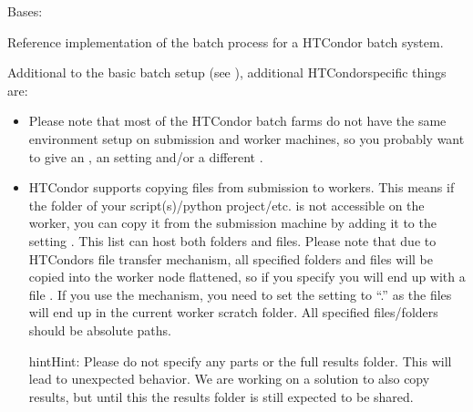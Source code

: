 \documentclass[letterpaper,10pt,english]{sphinxmanual}
\begin{document}
\begin{fulllineitems}
\label{\detokenize{usage/batch:b2luigi.batch.processes.htcondor.HTCondorProcess}}
Bases: {\hyperref[\detokenize{usage/batch:b2luigi.batch.processes.BatchProcess}]{}}

Reference implementation of the batch process for a HTCondor batch system.

Additional to the basic batch setup (see {\hyperref[\detokenize{usage/batch:batch-label}]{}}), additional
HTCondor\sphinxhyphen{}specific things are:
\begin{itemize}
\item {} 
Please note that most of the HTCondor batch farms do not have the same
environment setup on submission and worker machines, so you probably want to give an
, an  setting and/or a different .

\item {} 
HTCondor supports copying files from submission to workers. This means if the
folder of your script(s)/python project/etc. is not accessible on the worker, you can
copy it from the submission machine by adding it to the setting .
This list can host both folders and files.
Please note that due to HTCondors file transfer mechanism, all specified folders
and files will be copied into the worker node flattened, so if you specify
 you will end up with a file .
If you use the  mechanism, you need to set the  setting to “.”
as the files will end up in the current worker scratch folder.
All specified files/folders should be absolute paths.

\begin{sphinxadmonition}{hint}{Hint:}
Please do not specify any parts or the full results folder. This will lead to unexpected
behavior. We are working on a solution to also copy results, but until this the
results folder is still expected to be shared.
\end{sphinxadmonition}


\end{itemize}
\end{fulllineitems}
\end{document}
